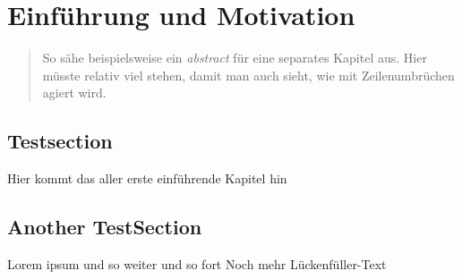 


\chapter{Einführung und Motivation}

\begin{quote}
    So sähe beispielsweise ein \textit{abstract} für eine separates Kapitel aus. Hier müsste relativ viel stehen, damit man
    auch sieht, wie mit Zeilenumbrüchen agiert wird.
\end{quote}


\section{Testsection}
Hier kommt das aller erste einführende Kapitel hin \cite{fitzgerald:realigning_research_and_practice}

\section{Another TestSection}
Lorem ipsum und so weiter und so fort
Noch mehr Lückenfüller-Text
